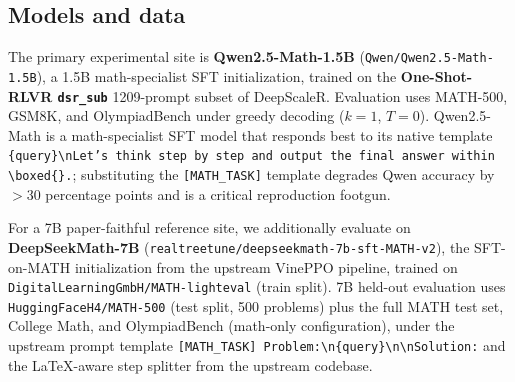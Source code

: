 \documentclass[11pt]{article}
\newcommand{\vineppo}{VinePPO}
\begin{document}
\subsection{Models and data}
The primary experimental site is \textbf{Qwen2.5-Math-1.5B}
(\texttt{Qwen/Qwen2.5-Math-1.5B}), a 1.5B math-specialist SFT
initialization, trained on the \textbf{One-Shot-RLVR \texttt{dsr\_sub}}
1209-prompt subset of DeepScaleR. Evaluation uses MATH-500, GSM8K, and
OlympiadBench under greedy decoding ($k{=}1$, $T{=}0$). Qwen2.5-Math is a
math-specialist SFT model that responds best to its native template
\texttt{\{query\}\textbackslash nLet's think step by step and output the
final answer within \textbackslash boxed\{\}.}; substituting the
\texttt{[MATH\_TASK]} template degrades Qwen accuracy by ${>}30$ percentage
points and is a critical reproduction footgun.

For a 7B paper-faithful reference site, we additionally evaluate on
\textbf{DeepSeekMath-7B} (\texttt{realtreetune/deepseekmath-7b-sft-MATH-v2}),
the SFT-on-MATH initialization from the upstream \vineppo{} pipeline,
trained on \texttt{DigitalLearningGmbH/MATH-lighteval} (train split). 7B
held-out evaluation uses \texttt{HuggingFaceH4/MATH-500} (test split, 500
problems) plus the full MATH test set, College Math, and OlympiadBench
(math-only configuration), under the upstream prompt template
\texttt{[MATH\_TASK] Problem:\textbackslash n\{query\}\textbackslash n\textbackslash nSolution:}
and the LaTeX-aware step splitter from the upstream codebase.
\end{document}
